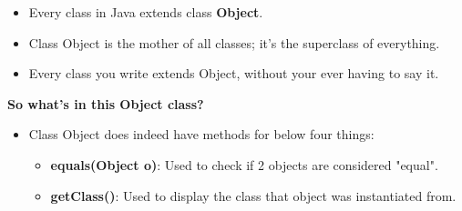 \setlength{\columnsep}{3pt}
\begin{flushleft}
	
	\begin{itemize}
		\item Every class in Java extends class \textbf{Object}.
		\item Class Object is the mother of all classes; it’s the superclass of everything.
		\item Every class you write extends Object, without your ever having to say it.
	\end{itemize}	
	\bigskip
	\textbf{So what’s in this Object class?}
	\begin{itemize}
		\item Class Object does indeed have methods for below four things:
		
		
		\newpage
		\begin{itemize}
			\item \textbf{equals(Object o)}: Used to check if 2 objects are considered "equal".
			\bigskip
			\bigskip
			\newpage
			\item \textbf{getClass()}: Used to display the class that object was instantiated from.
			\bigskip
			\bigskip
			\bigskip
	

\end{itemize}
\end{itemize}
\end{flushleft}
